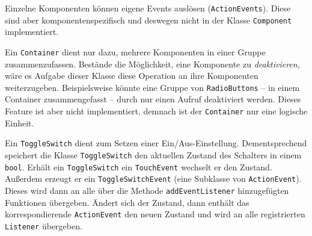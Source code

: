 		Einzelne Komponenten können eigene Events auslösen (\texttt{ActionEvents}).
		Diese sind aber komponentenspezifisch und deswegen nicht in der Klasse \texttt{Component} implementiert.
		
		\medskip
		\begin{figure}
			\label{uml-container}
		\end{figure}
		Ein \texttt{Container} dient nur dazu, mehrere Komponenten in einer Gruppe zusammenzufassen.
		Bestände die Möglichkeit, eine Komponente zu \emph{deaktivieren}, wäre es Aufgabe dieser Klasse diese Operation an ihre Komponenten weiterzugeben.
		Beispielsweise könnte eine Gruppe von \texttt{RadioButtons} -- in einem Container zusammengefasst -- durch nur einen Aufruf deaktiviert werden.
		Dieses Feature ist aber nicht implementiert, demnach ist der \texttt{Container} nur eine logische Einheit.
		
		\medskip
		\begin{figure}
			\label{uml-toggleswitch}
		\end{figure}
		Ein \texttt{ToggleSwitch} dient zum Setzen einer Ein/Aus-Einstellung.
		Dementsprechend speichert die Klasse \texttt{ToggleSwitch} den aktuellen Zustand des Schalters in einem \texttt{bool}.
		Erhält ein \texttt{ToggleSwitch} ein \texttt{TouchEvent} wechselt er den Zustand.
		Außerdem erzeugt er ein \texttt{ToggleSwitchEvent} (eine Subklasse von \texttt{ActionEvent}).
		Dieses wird dann an alle über die Methode \texttt{addEventListener} hinzugefügten Funktionen übergeben.
		Ändert sich der Zustand, dann enthält das korrespondierende \texttt{ActionEvent} den neuen Zustand und wird an alle registrierten \texttt{Listener} übergeben.
		
